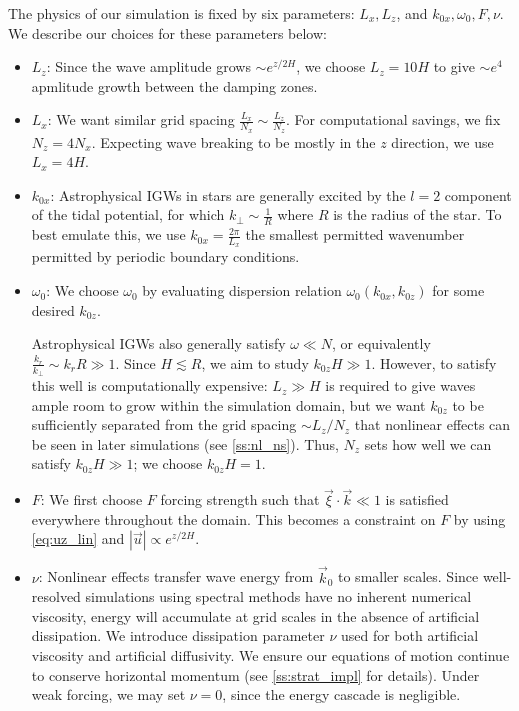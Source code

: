 \documentclass[
        fleqn,
        usenatbib,
    ]{mnras}
\newcommand*{\abs}[1]{\left|#1\right|}
\newcommand*{\p}[1]{\left(#1\right)}
\begin{document}
The physics of our simulation is fixed by six parameters: $L_x, L_z$, and
$k_{0x}, \omega_0, F, \nu$. We describe our choices for these parameters below:
\begin{itemize}
    \item $L_z$: Since the wave amplitude grows $\sim e^{z/2H}$, we choose $L_z
        = 10H$ to give $\sim e^4$ apmlitude growth between the damping zones.

    \item $L_x$: We want similar grid spacing $\frac{L_x}{N_x} \sim
        \frac{L_z}{N_z}$. For computational savings, we fix $N_z = 4N_x$.
        Expecting wave breaking to be mostly in the $z$ direction, we use $L_x =
        4H$.

    \item $k_{0x}$: Astrophysical IGWs in stars are generally excited by the $l
        = 2$ component of the tidal potential, for which $k_{\perp} \sim
        \frac{1}{R}$ where $R$ is the radius of the star. To best emulate this,
        we use $k_{0x} = \frac{2\pi}{L_x}$ the smallest permitted wavenumber
        permitted by periodic boundary conditions.

    \item $\omega_0$: We choose $\omega_0$ by evaluating dispersion relation
        $\omega_0\p{k_{0x}, k_{0z}}$ for some desired $k_{0z}$.

        Astrophysical IGWs also generally satisfy $\omega \ll N$, or
        equivalently $\frac{k_r}{k_{\perp}} \sim k_rR \gg 1$. Since $H \lesssim
        R$, we aim to study $k_{0z}H \gg 1$. However, to satisfy this well is
        computationally expensive: $L_z \gg H$ is required to give waves ample
        room to grow within the simulation domain, but we want $k_{0z}$ to be
        sufficiently separated from the grid spacing $\sim L_z / N_z$ that
        nonlinear effects can be seen in later simulations (see
        \autoref{ss:nl_ns}). Thus, $N_z$ sets how well we can satisfy $k_{0z}H
        \gg 1$; we choose $k_{0z}H = 1$.

    \item $F$: We first choose $F$ forcing strength such that $\vec{\xi} \cdot
        \vec{k} \ll 1$ is satisfied everywhere throughout the domain. This
        becomes a constraint on $F$ by using \autoref{eq:uz_lin} and
        $\abs{\vec{u}} \propto e^{z/2H}$.

    \item $\nu$: Nonlinear effects transfer wave energy from $\vec{k}_{0}$ to
        smaller scales. Since well-resolved simulations using spectral methods
        have no inherent numerical viscosity, energy will accumulate at grid
        scales in the absence of artificial dissipation. We introduce
        dissipation parameter $\nu$ used for both artificial viscosity and artificial
        diffusivity. We ensure our equations of motion continue to conserve
        horizontal momentum (see \autoref{ss:strat_impl} for details). Under
        weak forcing, we may set $\nu = 0$, since the energy cascade is
        negligible.
\end{itemize}
\end{document}
